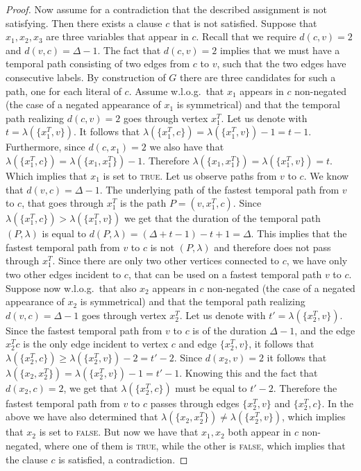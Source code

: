 \documentclass[a4paper,UKenglish,cleveref, autoref, thm-restate, anonymous]{lipics-v2021}
\begin{document}
\begin{proof}
Now assume for a contradiction that the described assignment is not satisfying. Then there exists a clause $c$ that is not satisfied. 
Suppose that $x_1, x_2, x_3$ are three variables that appear in $c$.
Recall that we require $d(c,v)=2$ and $d(v,c)=\Delta -1$. 
The fact that $d(c,v)=2$ implies that we must have a temporal path consisting of two edges from $c$ to $v$, 
such that the two edges have consecutive labels. 
By construction of $G$ there are three candidates for such a path, one for each literal of $c$. 
Assume w.l.o.g.\ that $x_1$ appears in $c$ non-negated (the case of a negated appearance of $x_1$ is symmetrical) and that the temporal path realizing $d(c,v)=2$ goes through vertex $x_1^T$. 
Let us denote with $t = \lambda(\{x_1^T, v\})$.
It follows that $\lambda(\{x_1^T, c\})=\lambda(\{x_1^T, v\})-1 = t - 1$.
Furthermore, since $d(c,x_1)=2$ we also have that $\lambda(\{x_1^T, c\})=\lambda(\{x_1, x_1^T\})-1$. 
Therefore $\lambda(\{x_1, x_1^T\})=\lambda(\{x_1^T, v\}) = t$. 
Which implies that $x_1$ is set to \textsc{true}.
%
Let us observe paths from $v$ to $c$.
We know that $d(v,c)=\Delta -1$.
The underlying path of the fastest temporal path from $v$ to $c$, that goes through $x_1^T$ is the path $P = (v,x_1^T,c)$.
Since $\lambda(\{x_1^T,c\}) > \lambda(\{x_1^T, v\})$ we get that the duration of the temporal path $(P,\lambda)$ is equal to 
$d(P,\lambda)= (\Delta + t-1) - t + 1 = \Delta$.
This implies that
the fastest temporal path from $v$ to $c$ is not $(P,\lambda)$ and therefore does not pass through $x_1^T$.
Since there are only two other vertices connected to $c$, 
we have only two other edges incident to $c$, that can be used on a fastest temporal path
$v$ to $c$.
Suppose now w.l.o.g.\ that also $x_2$ appears in $c$ non-negated (the case of a negated appearance of $x_2$ is symmetrical) and that the temporal path realizing $d(v,c)=\Delta-1$ goes through vertex $x_2^T$.
Let us denote with $t' = \lambda(\{x_2^T, v\})$.
Since the fastest temporal path from $v$ to $c$ is of the duration $\Delta - 1$,
and the edge $x_2^T c$ is the only edge incident to vertex $c$ and edge $\{x_2^T, v\}$,
it follows that $\lambda(\{x_2^T, c\}) \geq \lambda(\{x_2^T, v\}) - 2 = t' - 2$.
Since $d(x_2,v) = 2$ it follows that $\lambda(\{x_2, x_2^T\}) = \lambda (\{x_2^T, v\}) - 1 = t' - 1$.
Knowing this and the fact that $d(x_2,c)=2$, we get that $\lambda(\{x_2^T, c\})$ must be equal to $t'-2$.
Therefore the fastest temporal path from $v$ to $c$ passes through edges $\{x_2^T,v\}$ and $\{x_2^T,c\}$.
In the above we have also determined that $\lambda(\{x_2,x_2^T\}) \neq \lambda ( \{x_2^T,v\})$,
which implies that $x_2$ is set to \textsc{false}.
But now we have that $x_1,x_2$ both appear in $c$ non-negated, where one of them is \textsc{true}, while the other is \textsc{false},
which implies that the clause $c$ is satisfied, a contradiction. 



\end{proof}
\end{document}
